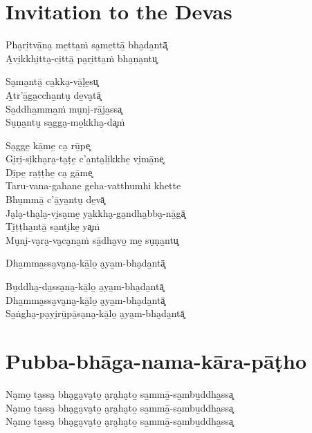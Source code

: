 \chapter{Invitation to the Devas}


\begin{paritta}
%
Pha̮ri̱tvā̱na̮ me̱tta̱ṁ sa̮me̱ttā̱ bha̮da̱ntā͓\\
A̮vi̱kkhi̱tta̮-ci̱ttā̱ pa̮ri̱tta̱ṁ bha̮ṇa̱ntu͓

%
Sa̮ma̱ntā̱ ca̱kka̮-vā̱ḷe̱su͓\\
A̱tr'ā̱ga̱ccha̱ntu̮ de̱va̮tā͓\\
Sa̱ddha̱mma̱ṁ mu̮ni̮-rā̱ja̱ssa͓\\
Su̮ṇa̱ntu̮ sa̱gga̮-mo̱kkha̮-da͓ṁ

Sa̱gge̱ kā̱me̱ ca̮ rū̱pe͓\\
Gi̮ri̮-si̮kha̮ra̮-ta̮ṭe̱ c'a̱nta̮li̱kkhe̱ vi̮mā̱ne͓\\
Dī̱pe̱ ra̱ṭṭhe̱ ca̮ gā̱me͓\\
Taru-vana-gahane geha-vatthumhi khette\\
Bhu̱mmā̱ c'ā̱ya̱ntu̮ de̱vā͓\\
Ja̮la̮-tha̮la̮-vi̮sa̮me̱ ya̱kkha̮-ga̱ndha̱bba̮-nā̱gā͓\\
Ti̱ṭṭha̱ntā̱ sa̱nti̮ke̱ ya͓ṁ\\
Mu̮ni̮-va̮ra̮-va̮ca̮na̱ṁ sā̱dha̮vo̱ me̱ su̮ṇa̱ntu͓

Dha̱mma̱ssa̮va̮na̮-kā̱lo̱ a̮ya̱m-bha̮da̱ntā͓


Bu̱ddha̮-da̱ssa̮na̮-kā̱lo̱ a̮ya̱m-bha̮da̱ntā͓\\
Dha̱mma̱ssa̮va̮na̮-kā̱lo̱ a̮ya̱m-bha̮da̱ntā͓\\
Sa̱ṅgha̮-pa̮yi̮rū̱pā̱sa̮na̮-kā̱lo̱ a̮ya̱m-bha̮da̱ntā͓
\end{paritta}

\clearpage

\chapter{Pubba-bhāga-nama-kāra-pāṭho}


\begin{paritta}
Na̮mo̱ ta̱ssa̮ bha̮ga̮va̮to̱ a̮ra̮ha̮to̱ sa̱mmā̱-sa̱mbu̱ddha̱ssa͓\\
Na̮mo̱ ta̱ssa̮ bha̮ga̮va̮to̱ a̮ra̮ha̮to̱ sa̱mmā̱-sa̱mbu̱ddha̱ssa͓\\
Na̮mo̱ ta̱ssa̮ bha̮ga̮va̮to̱ a̮ra̮ha̮to̱ sa̱mmā̱-sa̱mbu̱ddha̱ssa͓
\end{paritta}

